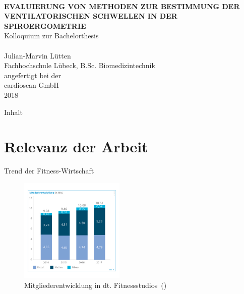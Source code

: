 \documentclass[colorBG,slideColor,8pt]{beamer}
\newcommand{\talktitle}{Evaluierung von Methoden zur Bestimmung der ventilatorischen Schwellen in der Spiroergometrie}
\begin{document}
\begin{frame}
    \vspace{-10ex}
    \textcolor{fhlred}{\HRuleFill[0.4ex]} \\ \vspace{1ex}
    {\linespread{1.5}\selectfont
    \MakeUppercase{\bf \huge \talktitle}\\[5.5ex]}
    \normalsize Kolloquium zur Bachelorthesis\\
    \textcolor{fhlred}{\HRuleFill[0.1ex]} \\ \vspace{4ex}
    \small Julian-Marvin Lütten\\
    \small Fachhochschule Lübeck, B.Sc. Biomedizintechnik\\
    \vspace{2ex}
    \small angefertigt bei der\\
    \small cardioscan GmbH\\
    \small 2018
\end{frame}

\begin{frame}{Inhalt}
\tableofcontents
\end{frame}


\section{Relevanz der Arbeit}

\begin{frame}{Trend der Fitness-Wirtschaft}
\begin{figure}[H]
	\includegraphics[width=5cm]{Bilder/Mitgliederentwicklung.png}
	\caption{Mitgliederentwicklung in dt. Fitnessstudios~(\cite{DSSV.2018})}
\end{figure}
\end{frame}
\end{document}
